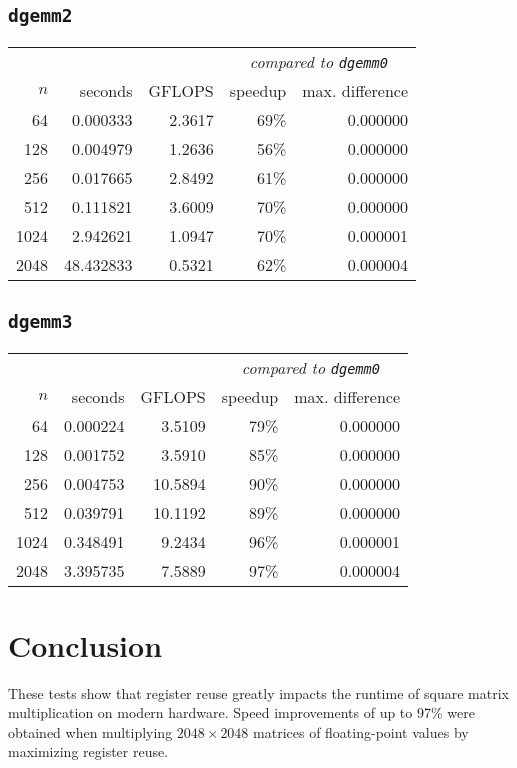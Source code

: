 \documentclass[12pt,letterpaper,oneside]{article}
\begin{document}
\begin{center}
    \subsection*{\texttt{dgemm2}}
    \label{results2}
    \begin{tabular}{r r r r r} 
        \multicolumn{3}{c}{} & \multicolumn{2}{c}{\textit{compared to \texttt{dgemm0}}} \\
        $n$ & seconds & GFLOPS & speedup & max. difference \\
        \hline
        64 & 0.000333 & 2.3617 & 69\% & 0.000000 \\
        128 & 0.004979 & 1.2636 & 56\% & 0.000000 \\
        256 & 0.017665 & 2.8492 & 61\% & 0.000000 \\
        512 & 0.111821 & 3.6009 & 70\% & 0.000000 \\
        1024 & 2.942621 & 1.0947 & 70\% & 0.000001 \\
        2048 & 48.432833 & 0.5321 & 62\% & 0.000004
    \end{tabular}
    
    \subsection*{\texttt{dgemm3}}
    \label{results3}
    \begin{tabular}{r r r r r} 
        \multicolumn{3}{c}{} & \multicolumn{2}{c}{\textit{compared to \texttt{dgemm0}}} \\
        $n$ & seconds & GFLOPS & speedup & max. difference \\
        \hline
        64 & 0.000224 & 3.5109 & 79\% & 0.000000 \\
        128 & 0.001752 & 3.5910 & 85\% & 0.000000 \\
        256 & 0.004753 & 10.5894 & 90\% & 0.000000 \\
        512 & 0.039791 & 10.1192 & 89\% & 0.000000 \\
        1024 & 0.348491 & 9.2434 & 96\% & 0.000001 \\
        2048 & 3.395735 & 7.5889 & 97\% & 0.000004
    \end{tabular}
\end{center}

\section*{Conclusion}
These tests show that register reuse greatly impacts the runtime of square matrix multiplication
on modern hardware. Speed improvements of up to 97\% were obtained when multiplying $2048\times2048$
matrices of floating-point values by maximizing register reuse.
 
\end{document}
